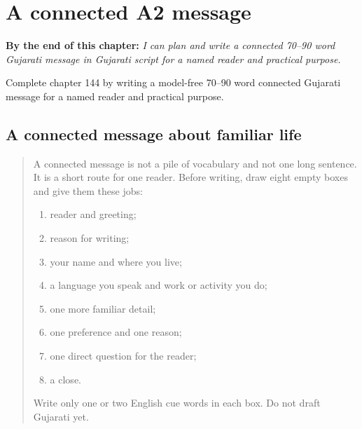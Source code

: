 
\chapter{A connected A2 message}
\label{ch:gu-a-connected-a2-message}

\begin{chapteropening}
\textbf{By the end of this chapter:} \emph{I can plan and write a connected 70–90 word Gujarati message in Gujarati script for a named reader and practical purpose.}

Complete chapter 144 by writing a model-free 70–90 word connected Gujarati message for a named reader and practical purpose.
\end{chapteropening}

\section[(connected A2 writing)]{A connected message about familiar life}

\label{lesson:GU-W11-a2-connected-composition}



\begin{quote}
A connected message is not a pile of vocabulary and not one long sentence. It is a short route for one reader. Before writing, draw eight empty boxes and give them these jobs:

\begin{enumerate}
\raggedright
  \item reader and greeting;
  \item reason for writing;
  \item your name and where you live;
  \item a language you speak and work or activity you do;
  \item one more familiar detail;
  \item one preference and one reason;
  \item one direct question for the reader;
  \item a close.
\end{enumerate}

Write only one or two English cue words in each box. Do not draft Gujarati yet.
\end{quote}

